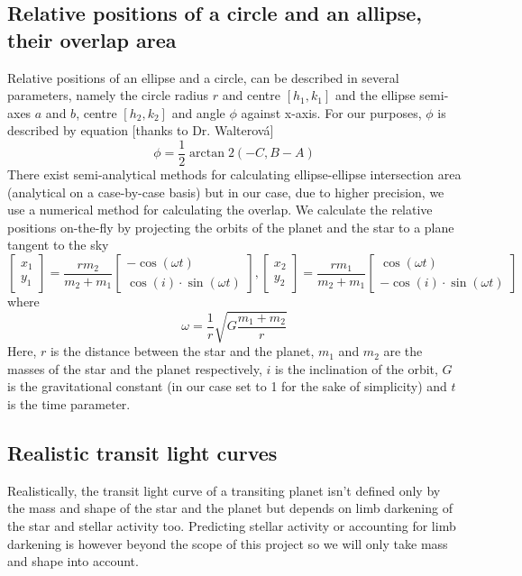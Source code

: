 \documentclass[10pt]{article}
\numberwithin{equation}{subsection}
\begin{document}
\subsection{Relative positions of a circle and an allipse, their overlap area}
Relative positions of an ellipse and a circle, can be described
in several parameters, namely the circle radius $r$ and centre $[h_1, k_1]$ and the
ellipse semi-axes $a$ and $b$, centre $[h_2, k_2]$ and angle $\phi$ against x-axis. For
our purposes, $\phi$ is described by equation \cite{correia1} [thanks to Dr. Walterová]
\begin{equation}
  \phi = \frac{1}{2}\arctan 2(-C, B-A)
  \label{eq:phi}
\end{equation}
There exist semi-analytical methods for calculating ellipse-ellipse intersection area
(analytical on a case-by-case basis) \cite{eeover} but in our case, due to higher
precision, we use a numerical method for calculating the overlap.
We calculate the relative positions on-the-fly by projecting the orbits of the planet
and the star to a plane tangent to the sky
\begin{equation}
  \begin{bmatrix}
    x_1 \\
    y_1 
  \end{bmatrix}
  = \frac{rm_2}{m_2+m_1}
  \begin{bmatrix}
    -\cos(\omega t) \\
    \cos(i)\cdot\sin(\omega t)
  \end{bmatrix},
  \begin{bmatrix}
    x_2 \\
    y_2 
  \end{bmatrix}
  = \frac{rm_1}{m_2+m_1}
  \begin{bmatrix}
    \cos(\omega t) \\
    -\cos(i)\cdot\sin(\omega t)
  \end{bmatrix}
  \label{eq:projected-orbit}
\end{equation}
where
\begin{equation}
  \omega = \frac{1}{r}\sqrt{G\frac{m_1 + m_2}{r}}
  \label{eq:omega}
\end{equation}
Here, $r$ is the distance between the star and the planet, $m_1$ and $m_2$ are the masses
of the star and the planet respectively, $i$ is the inclination of the orbit, $G$ is the
gravitational constant (in our case set to 1 for the sake of simplicity) and $t$ is the
time parameter.
\subsection{Realistic transit light curves}
Realistically, the transit light curve of a transiting planet isn't defined only by
the mass and shape of the star and the planet but depends on limb darkening of the star
and stellar activity too. Predicting stellar activity or accounting for limb darkening
is however beyond the scope of this project so we will only take mass and shape into
account.
\end{document}
